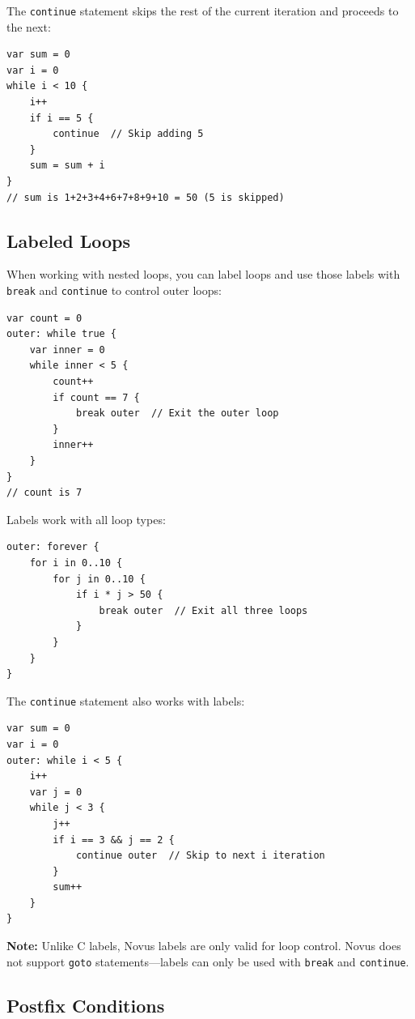 The \texttt{continue} statement skips the rest of the current iteration and proceeds to the next:

\begin{lstlisting}
var sum = 0
var i = 0
while i < 10 {
    i++
    if i == 5 {
        continue  // Skip adding 5
    }
    sum = sum + i
}
// sum is 1+2+3+4+6+7+8+9+10 = 50 (5 is skipped)
\end{lstlisting}

\subsection{Labeled Loops}
\label{subsec:labeled-loops}

When working with nested loops, you can label loops and use those labels with \texttt{break} and \texttt{continue} to control outer loops:

\begin{lstlisting}
var count = 0
outer: while true {
    var inner = 0
    while inner < 5 {
        count++
        if count == 7 {
            break outer  // Exit the outer loop
        }
        inner++
    }
}
// count is 7
\end{lstlisting}

Labels work with all loop types:

\begin{lstlisting}
outer: forever {
    for i in 0..10 {
        for j in 0..10 {
            if i * j > 50 {
                break outer  // Exit all three loops
            }
        }
    }
}
\end{lstlisting}

The \texttt{continue} statement also works with labels:

\begin{lstlisting}
var sum = 0
var i = 0
outer: while i < 5 {
    i++
    var j = 0
    while j < 3 {
        j++
        if i == 3 && j == 2 {
            continue outer  // Skip to next i iteration
        }
        sum++
    }
}
\end{lstlisting}

\textbf{Note:} Unlike C labels, Novus labels are only valid for loop control. Novus does not support \texttt{goto} statements---labels can only be used with \texttt{break} and \texttt{continue}.

\subsection{Postfix Conditions}
\label{subsec:postfix-conditions}

